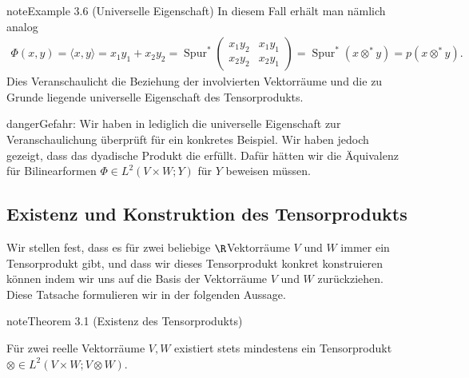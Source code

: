\documentclass[letterpaper,10pt,german]{jupyterBook}
\begin{document}
\begin{sphinxadmonition}{note}{Example 3.6 (Universelle Eigenschaft)}
In diesem Fall erhält man nämlich analog
\begin{equation*}
\begin{split}\Phi(x,y) = \langle x, y \rangle = x_1y_1 + x_2y_2 = \operatorname{Spur}^*
\begin{pmatrix}
x_1y_2 & x_1y_1 \\
x_2y_2 & x_2y_1
\end{pmatrix}
 = \operatorname{Spur}^*(x \otimes^* y) = p(x \otimes^* y).\end{split}
\end{equation*}
\sphinxAtStartPar
Dies Veranschaulicht die Beziehung der involvierten Vektorräume und die zu Grunde liegende universelle Eigenschaft des Tensorprodukts.
\end{sphinxadmonition}

\begin{sphinxadmonition}{danger}{Gefahr:}
\sphinxAtStartPar
Wir haben in {\hyperref[\detokenize{vektoranalysis/tensor:ex:universelleEigenschaft}]{}} lediglich die universelle Eigenschaft zur Veranschaulichung überprüft für ein konkretes Beispiel.
Wir haben jedoch  gezeigt, dass das dyadische Produkt die  erfüllt.
Dafür hätten wir die Äquivalenz für  Bilinearformen \(\Phi \in L^2(V \times W; Y)\) für  \(Y\) beweisen müssen.
\end{sphinxadmonition}


\subsection{Existenz und Konstruktion des Tensorprodukts}
\label{\detokenize{vektoranalysis/tensor:existenz-und-konstruktion-des-tensorprodukts}}
\sphinxAtStartPar
Wir stellen fest, dass es für zwei beliebige \(\R\)\sphinxhyphen{}Vektorräume \(V\) und \(W\) immer ein Tensorprodukt gibt, und dass wir dieses Tensorprodukt konkret konstruieren können indem wir uns auf die Basis der Vektorräume \(V\) und \(W\) zurückziehen.
Diese Tatsache formulieren wir in der folgenden Aussage.
\label{vektoranalysis/tensor:thm:existenzTensorprodukt}
\begin{sphinxadmonition}{note}{Theorem 3.1 (Existenz des Tensorprodukts)}



\sphinxAtStartPar
Für zwei reelle Vektorräume \(V, W\) existiert stets mindestens ein Tensorprodukt \(\otimes\in L^2(V\times W; V\otimes W)\).
\end{sphinxadmonition}
\end{document}
